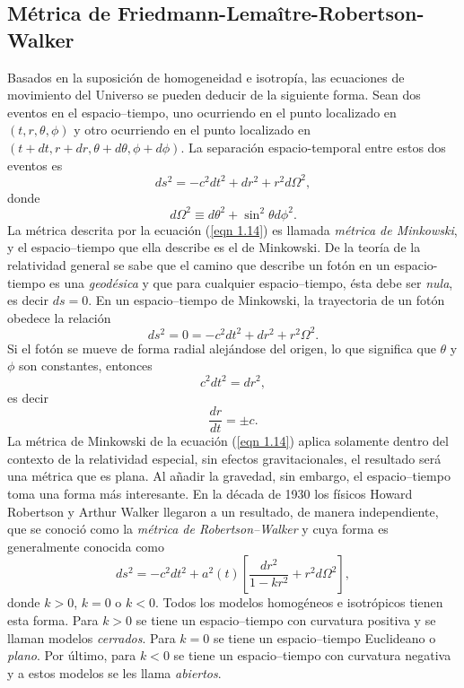 \documentclass[a4paper,openright,12pt]{book}
\begin{document}
\subsection*{Métrica de Friedmann-Lemaître-Robertson-Walker}
Basados en la suposición de homogeneidad e isotropía, las ecuaciones de movimiento del Universo se pueden deducir de la siguiente forma. Sean dos eventos en el espacio--tiempo, uno ocurriendo en el punto localizado en $(t,r,\theta , \phi)$ y otro ocurriendo en el punto localizado en $(t +dt, r + dr, \theta + d\theta, \phi + d\phi)$. La separación espacio-temporal entre estos dos eventos es
\begin{equation}
ds^{2}=-c^{2}dt^{2} + dr^{2} +r^{2}d\Omega^{2},\label{eqn 1.14}
\end{equation}
donde
\begin{equation*}
d\Omega^{2} \equiv d\theta^{2} + \sin^{2}\theta d\phi^{2}.
\end{equation*}
La métrica descrita por la ecuación (\ref{eqn 1.14}) es llamada \textit{métrica de Minkowski}, y el espacio--tiempo que ella describe es el de Minkowski. De la teoría de la relatividad general se sabe que el camino que describe un fotón en un espacio-tiempo es una \textit{geodésica} y que para cualquier espacio--tiempo, ésta debe ser \textit{nula}, es decir $ds=0$. En un espacio--tiempo de Minkowski, la trayectoria de un fotón obedece la relación
\begin{equation}
ds^{2}=0 = -c^{2}dt^{2} + dr^{2} +r^{2}\Omega^{2}.\label{eqn 1.15}
\end{equation}
Si el fotón se mueve de forma radial alejándose del origen, lo que significa que $\theta$ y $\phi$ son constantes, entonces
\begin{equation}
c^{2}dt^{2}=dr^{2},\label{eqn 1.16}
\end{equation}
es decir
\begin{equation}
\frac{dr}{dt}=\pm c. \label{eqn 1.17}
\end{equation}
La métrica de Minkowski de la ecuación (\ref{eqn 1.14}) aplica solamente dentro del contexto de la relatividad especial, sin efectos gravitacionales, el resultado será una  métrica que es plana. Al añadir la gravedad, sin embargo, el espacio--tiempo toma una forma más interesante. En la década de 1930 los físicos Howard Robertson y Arthur Walker llegaron a un resultado, de manera independiente, que se conoció como la \textit{métrica de Robertson--Walker} y cuya forma es generalmente conocida como
\begin{equation}
ds^{2}
=
-c^{2}dt^{2} + a^{2}(t)
\left[
\frac{dr^{2}}{1-k r^{2}} + r^{2}d\Omega^{2}
\right],\label{eqn 1.18}
\end{equation}
donde $k > 0$, $k = 0$ o $k < 0$. Todos los modelos homogéneos e isotrópicos tienen esta forma. Para $k > 0$ se tiene un espacio--tiempo con curvatura positiva y se llaman modelos \textit{cerrados}. Para $k = 0$ se tiene un espacio--tiempo Euclideano o \textit{plano}. Por último, para $k < 0$ se tiene un espacio--tiempo con curvatura negativa y a estos modelos se les llama \textit{abiertos}.
\end{document}
